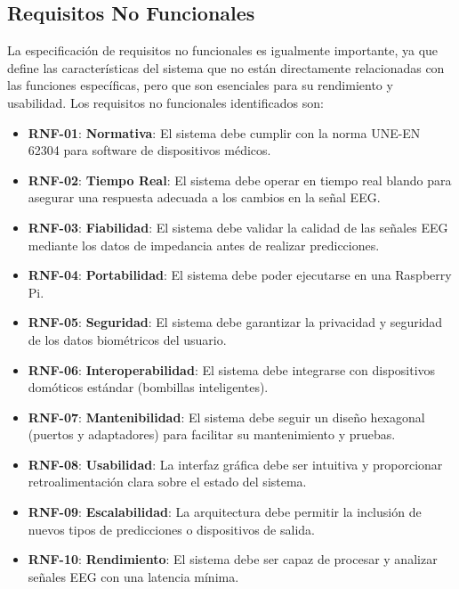 \subsection{Requisitos No Funcionales}

La especificación de requisitos no funcionales es igualmente importante, ya que define las características del sistema que no están directamente relacionadas con las funciones específicas, pero que son esenciales para su rendimiento y usabilidad. Los requisitos no funcionales identificados son:

\begin{itemize}
    \item \textbf{RNF-01}: \textbf{Normativa}: El sistema debe cumplir con la norma UNE-EN 62304 para software de dispositivos médicos.\label{rnf-01}
    \item \textbf{RNF-02}: \textbf{Tiempo Real}: El sistema debe operar en tiempo real blando para asegurar una respuesta adecuada a los cambios en la señal EEG.\label{rnf-02}
    \item \textbf{RNF-03}: \textbf{Fiabilidad}: El sistema debe validar la calidad de las señales EEG mediante los datos de impedancia antes de realizar predicciones.\label{rnf-03}
    \item \textbf{RNF-04}: \textbf{Portabilidad}: El sistema debe poder ejecutarse en una Raspberry Pi.\label{rnf-04}
    \item \textbf{RNF-05}: \textbf{Seguridad}: El sistema debe garantizar la privacidad y seguridad de los datos biométricos del usuario.\label{rnf-05}
    \item \textbf{RNF-06}: \textbf{Interoperabilidad}: El sistema debe integrarse con dispositivos domóticos estándar (bombillas inteligentes).\label{rnf-06}
    \item \textbf{RNF-07}: \textbf{Mantenibilidad}: El sistema debe seguir un diseño hexagonal (puertos y adaptadores) para facilitar su mantenimiento y pruebas.\label{rnf-07}
    \item \textbf{RNF-08}: \textbf{Usabilidad}: La interfaz gráfica debe ser intuitiva y proporcionar retroalimentación clara sobre el estado del sistema.\label{rnf-08}
    \item \textbf{RNF-09}: \textbf{Escalabilidad}: La arquitectura debe permitir la inclusión de nuevos tipos de predicciones o dispositivos de salida.\label{rnf-09}
    \item \textbf{RNF-10}: \textbf{Rendimiento}: El sistema debe ser capaz de procesar y analizar señales EEG con una latencia mínima.\label{rnf-10}
\end{itemize}

